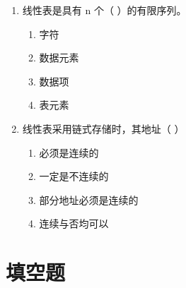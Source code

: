 \documentclass[12pt, a4paper]{article}
\begin{document}
\begin{enumerate}[label=\arabic*.]
	\item 线性表是具有 n 个（ ）的有限序列。
	      \begin{enumerate}
		      \item[A.] 字符
		      \item[B.] 数据元素
		      \item[C.] 数据项
		      \item[D.] 表元素
	      \end{enumerate}

	\item 线性表采用链式存储时，其地址（ ）
	      \begin{enumerate}
		      \item[A.] 必须是连续的
		      \item[B.] 一定是不连续的
		      \item[C.] 部分地址必须是连续的
		      \item[D.] 连续与否均可以
	      \end{enumerate}
\end{enumerate}

\section*{填空题}
\end{document}
